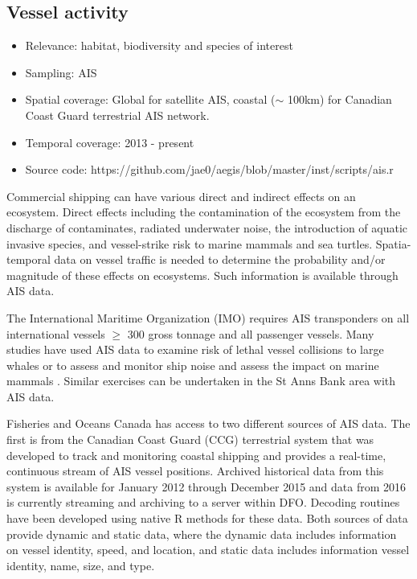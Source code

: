 \documentclass[letterpaper,portrait,11pt]{scrartcl}
\numberwithin{equation}{section}    %
\numberwithin{figure}{section}    %
\numberwithin{table}{section}       %
\begin{document}
\afterpage{\clearpage}
\subsection{Vessel activity}

\begin{itemize}
	\item Relevance:  habitat, biodiversity and species of interest
	\item Sampling:  AIS
	\item Spatial coverage: Global for satellite AIS, coastal ($\sim$ 100km) for Canadian Coast Guard terrestrial AIS network.
	\item Temporal coverage: 2013 - present
	\item Source code: https://github.com/jae0/aegis/blob/master/inst/scripts/ais.r
\end{itemize}


Commercial shipping can have various direct and indirect effects on an ecosystem. Direct effects including the contamination of the ecosystem from the discharge of contaminates, radiated underwater noise, the introduction of aquatic invasive species, and vessel-strike risk to marine mammals and sea turtles. Spatia-temporal data on vessel traffic is needed to determine the probability and/or magnitude of these effects on ecosystems. Such information is available through AIS data.

The International Maritime Organization (IMO) requires AIS transponders on all international vessels $\geq$ 300 gross tonnage and all passenger vessels.  Many studies have used AIS data to examine risk of lethal vessel collisions to large whales \parencite[e.g.,][ ]{vanderlaan:2009:efficacy, wiley:2011:modeling, redfern2013assessing, guzman2013potential} or to assess and monitor ship noise and assess the impact on marine mammals \parencite{ hatch2008characterizing, mckenna2012underwater, hatch2012quantifying, merchant2014monitoring}. Similar exercises can be undertaken in the St Anns Bank area with AIS data.

Fisheries and Oceans Canada has access to two different sources of AIS data.  The first is from the Canadian Coast Guard (CCG) terrestrial system that was developed to track and monitoring coastal shipping and provides a real-time, continuous stream of AIS vessel positions.  Archived historical data from this system is available for January 2012 through December 2015 and data from 2016 is currently streaming and archiving to a server within DFO. Decoding routines have been developed using native R methods for these data.   Both sources of data provide dynamic and static data, where the dynamic data includes information on vessel identity, speed, and location, and static data includes information vessel identity, name, size, and type.
\end{document}
